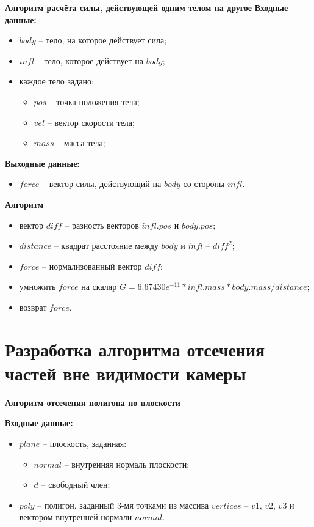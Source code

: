 \textbf{Алгоритм расчёта силы, действующей одним телом на другое}
\textbf{Входные данные:}
\begin{itemize}
	\item $body$ -- тело, на которое действует сила;
	\item $infl$ -- тело, которое действует на $body$;
	\item каждое тело задано:
	\begin{itemize}
		\item $pos$ -- точка положения тела;
		\item $vel$ -- вектор скорости тела;
		\item $mass$ -- масса тела;
	\end{itemize}
\end{itemize}

\textbf{Выходные данные:}
\begin{itemize}
	\item $force$ -- вектор силы, действующий на $body$ со стороны $infl$.
\end{itemize}

\textbf{Алгоритм}

\begin{itemize}
	\item вектор $diff$ -- разность векторов $infl.pos$ и $body.pos$;
	\item $distance$ -- квадрат расстояние между $body$ и $infl$ -- $diff^2$;
	\item $force$ -- нормализованный вектор $diff$;
	\item умножить $force$ на скаляр $G=6.67430e^{-11} * infl.mass * body.mass / distance$;
	\item возврат $force$.
\end{itemize}

\section{Разработка алгоритма отсечения частей вне видимости камеры}

\textbf{Алгоритм отсечения полигона по плоскости}

\textbf{Входные данные:}
\begin{itemize}
	\item $plane$ -- плоскость, заданная:
	\begin{itemize}
		\item $normal$ -- внутренняя нормаль плоскости;
		\item $d$ -- свободный член;
	\end{itemize}
	\item $poly$ -- полигон, заданный 3-мя точками из массива $vertices$ -- $v1$, $v2$, $v3$ и вектором внутренней нормали $normal$.
\end{itemize}

